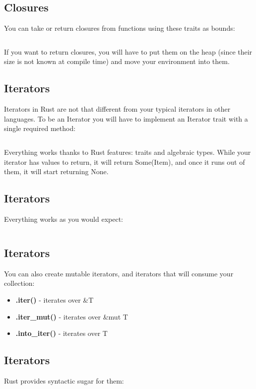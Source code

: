 \documentclass[usenames,twocolumn,dvipsnames,10pt,a4wide]{article}
\begin{document}
\subsection{Closures}
	You can take or return closures from functions using
	these traits as bounds:
	
	\inputminted[fontsize=\normalsize]{rust}{code/closures8.rs}
	
	If you want to return closures, you will have to put them
	on the heap (since their size is not known at compile time)
	and move your environment into them.
	


\subsection{Iterators}
	Iterators in Rust are not that different from your
	typical iterators in other languages. To be an Iterator
	you will have to implement an Iterator trait with a single
	required method:
	
	\inputminted[fontsize=\normalsize]{rust}{code/iterators1.rs}
	
	Everything works thanks to Rust features: traits and
	algebraic types. While your iterator has values to return,
	it will return Some(Item), and once it runs out of them,
	it will start returning None.


\subsection{Iterators}
	Everything works as you would expect:
	
	\inputminted[fontsize=\normalsize]{rust}{code/iterators2.rs}


\subsection{Iterators}
	You can also create mutable iterators, and iterators
	that will consume your collection:
	
\begin{itemize}[label=$\bullet$]
	\item \textbf{.iter()} - iterates over \&T 
	\item \textbf{.iter\_mut()} - iterates over \&mut T
	\item \textbf{.into\_iter()} - iterates over T
\end{itemize}


\subsection{Iterators}
	Rust provides syntactic sugar for them:
	
\end{document}
